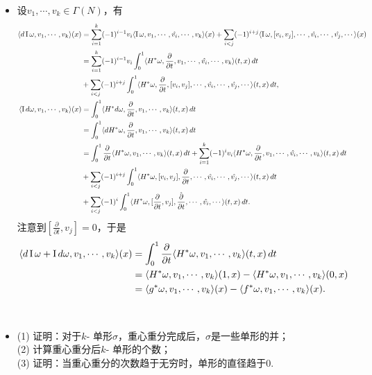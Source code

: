 \begin{itemize}
    \item[\textit{Pf:}]
    设$v_1,\cdots,v_k\in\Gamma(N)$，有
    \begin{align*}
		\langle d\operatorname{I}\omega,v_1,\cdots,v_k\rangle(x)
		&=\sum\limits_{i=1}^{k}(-1)^{i-1}v_i\langle \operatorname{I}\omega,v_1,\cdots,\hat{v_i},\cdots,v_k\rangle(x)
        +\sum\limits_{i<j}(-1)^{i+j}\langle \operatorname{I}\omega,[v_i,v_j],\cdots,\hat{v_i},\cdots,\hat{v_j},\cdots\rangle(x)\\
		&=\sum\limits_{i=1}^{k}(-1)^{i-1}v_i\int_0^1\langle H^*\omega, \frac{\partial}{\partial t},v_1,\cdots,\hat{v_i},\cdots,v_{k}\rangle(t,x) \,dt\\
		&+\sum\limits_{i<j}(-1)^{i+j}\int_0^1\langle H^*\omega,\frac{\partial}{\partial t},[v_i,v_j],\cdots,\hat{v_i},\cdots,\hat{v_j},\cdots\rangle(t,x) \,dt,\\
		\langle \operatorname{I} d\omega,v_1,\cdots,v_k\rangle(x)
		&=\int_0^1\langle H^*d\omega,\frac{\partial}{\partial t},v_1,\cdots,v_{k}\rangle(t,x) \,dt\\
		&=\int_0^1\langle dH^*\omega,\frac{\partial}{\partial t},v_1,\cdots,v_{k}\rangle(t,x) \,dt\\
		&=\int_0^1\frac{\partial}{\partial t}\langle H^*\omega,v_1,\cdots,v_{k}\rangle(t,x) \,dt
        +\sum\limits_{i=1}^{k}(-1)^iv_i\langle H^*\omega,\frac{\partial}{\partial t},v_1,\cdots,\hat{v_i},\cdots,v_{k}\rangle(t,x) \,dt\\
		&+\sum\limits_{i<j}(-1)^{i+j}\int_0^1\langle H^*\omega,[v_i,v_j],\frac{\partial}{\partial t},\cdots,\hat{v_i},\cdots,\hat{v_j},\cdots\rangle(t,x) \,dt\\
		&+\sum\limits_{i<j}(-1)^{i}\int_0^1\langle H^*\omega,[\frac{\partial}{\partial t},v_j],\hat{\frac{\partial}{\partial t}},\cdots,\hat{v_i},\cdots\rangle(t,x) \,dt.
	\end{align*}
	注意到$\displaystyle [\frac{\partial}{\partial t},v_j]=0$，于是
	\begin{align*}
		\langle d\operatorname{I}\omega+\operatorname{I} d\omega,v_1,\cdots,v_k\rangle(x)
		&=\int_0^1\frac{\partial}{\partial t}\langle H^*\omega,v_1,\cdots,v_{k}\rangle(t,x) \,dt\\
		&=\langle H^*\omega,v_1,\cdots,v_{k}\rangle(1,x)-\langle H^*\omega,v_1,\cdots,v_{k}\rangle(0,x)\\
		&=\langle g^*\omega,v_1,\cdots,v_{k}\rangle(x)-\langle f^*\omega,v_1,\cdots,v_{k}\rangle(x).
	\end{align*}
    
    ~\\
    \item[10.]
    (1) 证明：对于$k$- 单形$\sigma$，重心重分完成后，$\sigma$是一些单形的并；\\
    (2) 计算重心重分后$k$- 单形的个数；\\
    (3) 证明：当重心重分的次数趋于无穷时，单形的直径趋于$0$.
    

\end{itemize}
